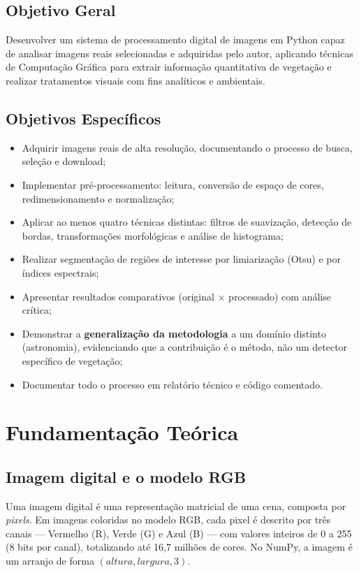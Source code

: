 \documentclass[12pt,a4paper]{article}
\begin{document}
\subsection{Objetivo Geral}
Desenvolver um sistema de processamento digital de imagens em Python capaz de analisar imagens
reais selecionadas e adquiridas pelo autor, aplicando técnicas de Computação Gráfica para extrair
informação quantitativa de vegetação e realizar tratamentos visuais com fins analíticos e
ambientais.

\subsection{Objetivos Específicos}
\begin{itemize}
  \item Adquirir imagens reais de alta resolução, documentando o processo de busca, seleção
        e download;
  \item Implementar pré-processamento: leitura, conversão de espaço de cores, redimensionamento
        e normalização;
  \item Aplicar ao menos quatro técnicas distintas: filtros de suavização, detecção de bordas,
        transformações morfológicas e análise de histograma;
  \item Realizar segmentação de regiões de interesse por limiarização (Otsu) e por índices
        espectrais;
  \item Apresentar resultados comparativos (original $\times$ processado) com análise crítica;
  \item Demonstrar a \textbf{generalização da metodologia} a um domínio distinto (astronomia),
        evidenciando que a contribuição é o método, não um detector específico de vegetação;
  \item Documentar todo o processo em relatório técnico e código comentado.
\end{itemize}

\section{Fundamentação Teórica}

\subsection{Imagem digital e o modelo RGB}
Uma imagem digital é uma representação matricial de uma cena, composta por \emph{pixels}. Em
imagens coloridas no modelo RGB, cada pixel é descrito por três canais --- Vermelho (R),
Verde (G) e Azul (B) --- com valores inteiros de 0 a 255 (8 bits por canal), totalizando até
16,7 milhões de cores. No NumPy, a imagem é um arranjo de forma $(altura, largura, 3)$.
\end{document}
